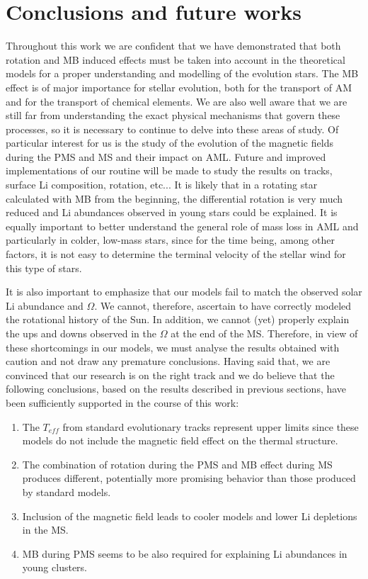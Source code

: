 \documentclass[fleqn,usenatbib]{mnras}
\begin{document}
\section{Conclusions and future works}
Throughout this work we are confident that we have demonstrated that both rotation and MB induced effects must be taken into account in the theoretical models for a proper understanding and modelling of the evolution stars. The MB effect is of major importance for stellar evolution, both for the transport of AM and for the transport of chemical elements. We are also well aware that we are still far from understanding the exact physical mechanisms that govern these processes, so it is necessary to continue to delve into these areas of study. Of particular interest for us is the study of the evolution of the magnetic fields during the PMS and MS and their impact on AML. Future and improved implementations of our routine will be made to study the results on tracks, surface Li composition, rotation, etc... It is likely that in a rotating star calculated with MB from the beginning, the differential rotation is very much reduced and Li abundances observed in young stars could be explained. It is equally important to better understand the general role of mass loss in AML and particularly in colder, low-mass stars, since for the time being, among other factors, it is not easy to determine the terminal velocity of the stellar wind for this type of stars.\par

It is also important to emphasize that our models fail to match the observed solar Li abundance and $\Omega$. We cannot, therefore, ascertain to have correctly modeled the rotational history of the Sun. In addition, we cannot (yet) properly explain the ups and downs observed in the $\Omega$ at the end of the MS. Therefore, in view of these shortcomings in our models, we must analyse the results obtained with caution and not draw any premature conclusions. Having said that, we are convinced that our research is on the right track and we do believe that the following conclusions, based on the results described in previous sections, have been sufficiently supported in the course of this work:
\begin{enumerate}
    \item The $T_{eff}$ from standard evolutionary tracks represent upper limits since these models do not include the magnetic field effect on the thermal structure.
    \item The combination of rotation during the PMS and MB effect during MS produces different, potentially more promising behavior than those produced by standard models.
    \item Inclusion of the magnetic field leads to cooler models and lower Li depletions in the MS.
    \item MB during PMS seems to be also required for explaining Li abundances in young clusters.
\end{enumerate}
\end{document}
